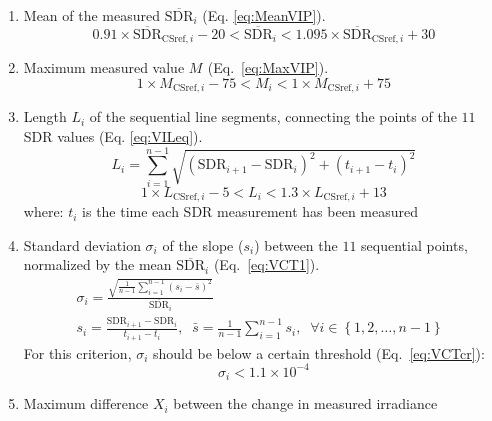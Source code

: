 \documentclass[An awesome
journal,,,moreauthors,pdftex]{Definitions/mdpi}
\providecommand{\tightlist}{%
  \setlength{\itemsep}{0pt}\setlength{\parskip}{0pt}}
\begin{document}
\begin{enumerate}
\def\labelenumi{\alph{enumi})}
\tightlist
\item
  Mean of the measured \(\overline{\text{SDR}}_i\) (Eq.
  \ref{eq:MeanVIP}). \begin{equation}
  0.91 \times \overline{\text{SDR}}_{\text{CSref},i} - 20
  < \overline{\text{SDR}}_i <
  1.095 \times \overline{\text{SDR}}_{\text{CSref},i} + 30
  \label{eq:MeanVIP}
  \end{equation}
\item
  Maximum measured value \(M_{\text{}}\) (Eq.~\ref{eq:MaxVIP}).
  \begin{equation}
  1 \times M_{\text{CSref},i} - 75
  < M_{\text{}i} <
  1 \times M_{\text{CSref},i} + 75
  \label{eq:MaxVIP}
  \end{equation}
\item
  Length \(L_i\) of the sequential line segments, connecting the points
  of the \(11\) SDR values (Eq. \ref{eq:VILeq}). \begin{equation}
  L_i = \sum_{i=1}^{n-1}\sqrt{\left ( \text{SDR}_{i+1} - \text{SDR}_{i}\right )^2 + \left ( t_{i+1} - t_i \right )^2}
  \label{eq:VILeq}
  \end{equation} \begin{equation}
  1 \times L_{\text{CSref},i} - 5 < L_i < 1.3 \times L_{\text{CSref},i} + 13
  \label{eq:VILcr}
  \end{equation} where: \(t_i\) is the time each SDR measurement has
  been measured
\item
  Standard deviation \(\sigma_i\) of the slope (\(s_i\)) between the
  \(11\) sequential points, normalized by the mean
  \(\overline{\text{SDR}}_i\) (Eq.~\ref{eq:VCT1}). \begin{gather}
    \sigma_i = \frac {\sqrt{\frac{1}{n-1} \sum_{i=1}^{n-1} \left( s_i - \bar{s} \right)^2}} {\overline{\text{SDR}}_i} \label{eq:VCT1} \\
    s_i = \frac{\text{SDR}_{i+1} - \text{SDR}_{i}}{t_{i+1} - t_i},\;\;   \bar{s} = \frac{1}{n-1} \sum_{i=1}^{n-1} s_i,\;\;\forall i \in \left \{ 1, 2, \ldots, n-1 \right \}\;\;
  \end{gather} For this criterion, \(\sigma_i\) should be below a
  certain threshold (Eq.~\ref{eq:VCTcr}): \begin{equation}
    \sigma_i < \ensuremath{1.1\times 10^{-4}} \label{eq:VCTcr}
  \end{equation}
\item
  Maximum difference \(X_i\) between the change in measured irradiance

\end{enumerate}
\end{document}
